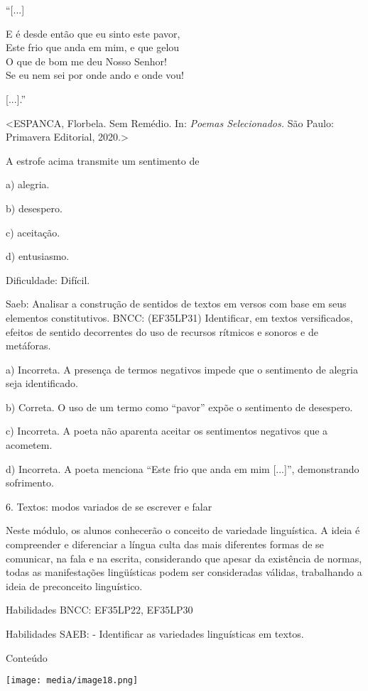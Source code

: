``{[}...{]}

E é desde então que eu sinto este pavor,\\
Este frio que anda em mim, e que gelou\\
O que de bom me deu Nosso Senhor!\\
Se eu nem sei por onde ando e onde vou!

{[}...{]}.''

\textless{}ESPANCA, Florbela. Sem Remédio. In: \emph{Poemas
Selecionados.} São Paulo: Primavera Editorial, 2020.\textgreater{}

A estrofe acima transmite um sentimento de

a) alegria.

b) desespero.

c) aceitação.

d) entusiasmo.

Dificuldade: Difícil.

Saeb: Analisar a construção de sentidos de textos em versos com base em
seus elementos constitutivos. BNCC: (EF35LP31) Identificar, em textos
versificados, efeitos de sentido decorrentes do uso de recursos rítmicos
e sonoros e de metáforas.

a) Incorreta. A presença de termos negativos impede que o sentimento de
alegria seja identificado.

b) Correta. O uso de um termo como ``pavor'' expõe o sentimento de
desespero.

c) Incorreta. A poeta não aparenta aceitar os sentimentos negativos que
a acometem.

d) Incorreta. A poeta menciona ``Este frio que anda em mim {[}...{]}'',
demonstrando sofrimento.

6. Textos: modos variados de se escrever e falar

Neste módulo, os alunos conhecerão o conceito de variedade linguística.
A ideia é compreender e diferenciar a língua culta das mais diferentes
formas de se comunicar, na fala e na escrita, considerando que apesar da
existência de normas, todas as manifestações lingüísticas podem ser
consideradas válidas, trabalhando a ideia de preconceito linguístico.

Habilidades BNCC: EF35LP22, EF35LP30

Habilidades SAEB: - Identificar as variedades linguísticas em textos.

Conteúdo

\texttt{[image: media/image18.png]}

